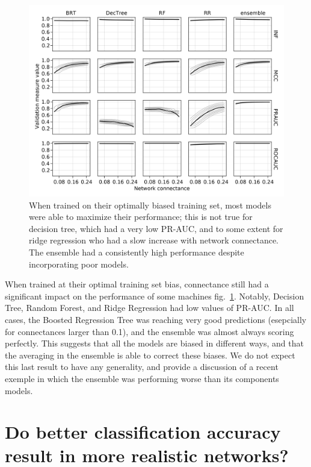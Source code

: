 \documentclass[10pt,oneside]{article}
\makeatletter
\def\maxwidth{\ifdim\Gin@nat@width>\linewidth\linewidth
\else\Gin@nat@width\fi}
\let\Oldincludegraphics\includegraphics
\renewcommand{\includegraphics}[1]{\Oldincludegraphics[width=\maxwidth]{#1}}
\makeatother
\begin{document}
\begin{figure}
\hypertarget{fig:optimperf}{%
\centering
\includegraphics{figures/optim_perf.png}
\caption{When trained on their optimally biased training set, most
models were able to maximize their performance; this is not true for
decision tree, which had a very low PR-AUC, and to some extent for ridge
regression who had a slow increase with network connectance. The
ensemble had a consistently high performance despite incorporating poor
models.}\label{fig:optimperf}
}
\end{figure}

When trained at their optimal training set bias, connectance still had a
significant impact on the performance of some machines
fig.~\ref{fig:optimperf}. Notably, Decision Tree, Random Forest, and
Ridge Regression had low values of PR-AUC. In all cases, the Boosted
Regression Tree was reaching very good predictions (esepcially for
connectances larger than 0.1), and the ensemble was almost always
scoring perfectly. This suggests that all the models are biased in
different ways, and that the averaging in the ensemble is able to
correct these biases. We do not expect this last result to have any
generality, and provide a discussion of a recent exemple in which the
ensemble was performing worse than its components models.

\hypertarget{do-better-classification-accuracy-result-in-more-realistic-networks}{%
\section{Do better classification accuracy result in more realistic
networks?}\label{do-better-classification-accuracy-result-in-more-realistic-networks}}
\end{document}
